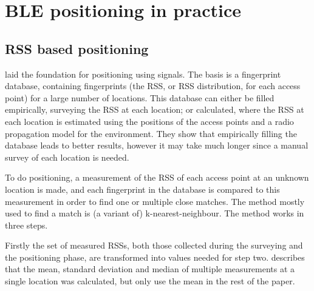 \chapter{BLE positioning in practice}
\label{chap:architecture}

\section{RSS based positioning}
\label{sec:architecture-rss-based-positioning}
\citet{bahl2000radar} laid the foundation for positioning using \wifi signals.
The basis is a fingerprint database, containing fingerprints (the RSS, or RSS distribution, for each access point) for a large number of locations.
This database can either be filled empirically, surveying the RSS at each location; or calculated, where the RSS at each location is estimated using the positions of the access points and a radio propagation model for the environment.
They show that empirically filling the database leads to better results, however it may take much longer since a manual survey of each location is needed.

To do positioning, a measurement of the RSS of each access point at an unknown location is made, and each fingerprint in the database is compared to this measurement in order to find one or multiple close matches.
The method mostly used to find a match is (a variant of) k-nearest-neighbour.
The method works in three steps.

Firstly the set of measured RSSs, both those collected during the surveying and the positioning phase, are transformed into values needed for step two.
\citet{bahl2000radar} describes that the mean, standard deviation and median of multiple measurements at a single location was calculated, but only use the mean in the rest of the paper.

